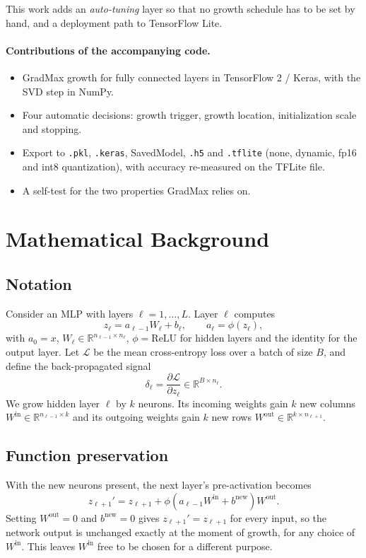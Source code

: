 \documentclass[11pt,a4paper]{article}
\newcommand{\code}[1]{\texttt{#1}}
\newcommand{\R}{\mathbb{R}}
\begin{document}
This work adds an \emph{auto-tuning} layer so that no growth schedule has to be set by hand, and a deployment path to TensorFlow Lite.

\paragraph{Contributions of the accompanying code.}
\begin{itemize}[nosep]
  \item GradMax growth for fully connected layers in TensorFlow 2 / Keras, with the SVD step in NumPy.
  \item Four automatic decisions: growth trigger, growth location, initialization scale and stopping.
  \item Export to \code{.pkl}, \code{.keras}, SavedModel, \code{.h5} and \code{.tflite} (none, dynamic, fp16 and int8 quantization), with accuracy re-measured on the TFLite file.
  \item A self-test for the two properties GradMax relies on.
\end{itemize}

\section{Mathematical Background}
\subsection{Notation}
Consider an MLP with layers $\ell = 1,\dots,L$. Layer $\ell$ computes
\[
z_\ell = a_{\ell-1} W_\ell + b_\ell, \qquad a_\ell = \phi(z_\ell),
\]
with $a_0 = x$, $W_\ell \in \R^{n_{\ell-1}\times n_\ell}$, $\phi=\mathrm{ReLU}$ for hidden layers and the identity for the output layer. Let $\mathcal{L}$ be the mean cross-entropy loss over a batch of size $B$, and define the back-propagated signal
\[
\delta_{\ell} = \frac{\partial \mathcal{L}}{\partial z_\ell} \in \R^{B\times n_\ell}.
\]
We grow hidden layer $\ell$ by $k$ neurons. Its incoming weights gain $k$ new columns $W^{\mathrm{in}}\in\R^{n_{\ell-1}\times k}$ and its outgoing weights gain $k$ new rows $W^{\mathrm{out}}\in\R^{k\times n_{\ell+1}}$.

\subsection{Function preservation}
With the new neurons present, the next layer's pre-activation becomes
\[
z_{\ell+1}' = z_{\ell+1} + \phi\!\left(a_{\ell-1}W^{\mathrm{in}} + b^{\mathrm{new}}\right) W^{\mathrm{out}}.
\]
Setting $W^{\mathrm{out}}=0$ and $b^{\mathrm{new}}=0$ gives $z_{\ell+1}'=z_{\ell+1}$ for every input, so the network output is unchanged exactly at the moment of growth, for any choice of $W^{\mathrm{in}}$. This leaves $W^{\mathrm{in}}$ free to be chosen for a different purpose.
\end{document}
